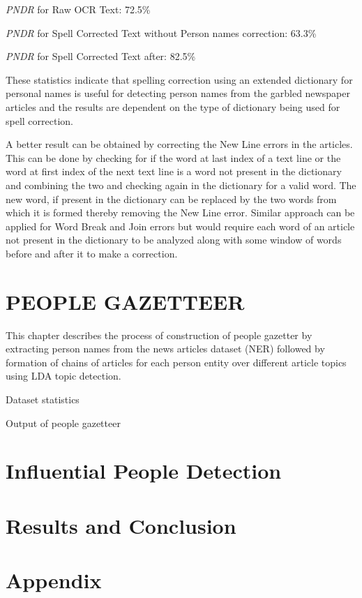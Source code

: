 \documentclass[letterpaper,11pt]{report}
\begin{document}
\textit{PNDR} for Raw OCR Text: 72.5\% 

\textit{PNDR} for Spell Corrected Text without Person names correction: 63.3\% 

\textit{PNDR} for Spell Corrected Text after: 82.5\% 

These statistics indicate that spelling correction using an extended dictionary for personal names is useful for detecting person names from the garbled newspaper articles and the results are dependent on the type of dictionary being used for spell correction.
 
A better result can be obtained by correcting the New Line errors in the articles. This can be done by checking for if the word at last index of a text line or the word at first index of the next text line is a word not present in the dictionary and combining the two and checking again in the dictionary for a valid word. The new word, if present in the dictionary can be replaced by the two words from which it is formed thereby removing the New Line error. Similar approach can be applied for Word Break and Join errors but would require each word of an article not present in the dictionary to be analyzed along with some window of words before and after it to make a correction. 
 
\chapter{PEOPLE GAZETTEER}\label{chapter:people gazetteer}

This chapter describes the process of construction of people gazetter by extracting person names from the news articles dataset (NER) followed by formation of chains of articles for each person entity over different article topics using LDA topic detection.

Dataset statistics

Output of people gazetteer

\chapter{Influential People Detection}\label{chapter:influential people detection}
\chapter{Results and Conclusion}\label{chapter:results and conclusion}
%

%
%


\chapter*{Appendix}\label{chapter:appendix} 
\end{document}

